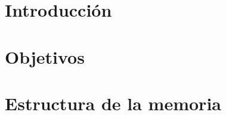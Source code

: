 \documentclass[12pt,a4paper]{article}
\begin{document}
	
	 \section{Introducción}\label{Introduccion}
		
	\section{Objetivos}\label{Objetivos}
		
	\section{Estructura de la memoria}\label{Estructura}
		
\newpage
\end{document}

